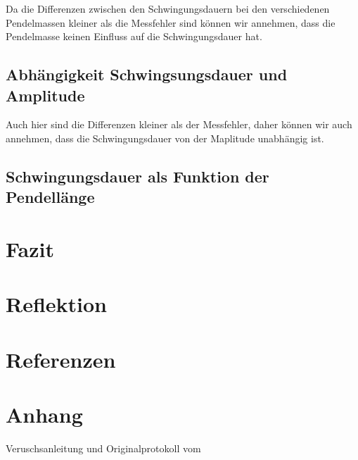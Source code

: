 \documentclass[12pt, a4paper, twoside]{article}
\begin{document}
Da die Differenzen zwischen den Schwingungsdauern bei den verschiedenen Pendelmassen kleiner als die Messfehler sind können wir annehmen, dass die Pendelmasse keinen Einfluss auf die Schwingungsdauer hat.

\subsection{Abhängigkeit Schwingsungsdauer und Amplitude}


Auch hier sind die Differenzen kleiner als der Messfehler, daher können wir auch annehmen, dass die Schwingungsdauer von der Maplitude unabhängig ist.

\subsection{Schwingungsdauer als Funktion der Pendellänge}

\section{Fazit}
\section{Reflektion}
\section{Referenzen}
\printbibliography[heading=none]
\section{Anhang}
Veruschsanleitung und Originalprotokoll vom \labdate
\end{document}
